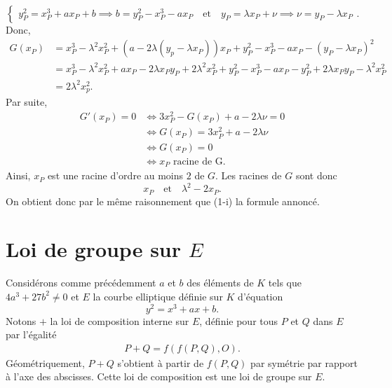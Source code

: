 \begin{demonstration}
\begin{description}
\begin{description}
\[\begin{cases}
                y_P^2=x_P^3+ax_P+b \implies b=y_P^2-x_P^3-ax_P \quad \text{et} \quad y_P=\lambda x_P + \nu \implies \nu = y_P - \lambda x_P
                    \end{cases}
                .\] 
                Donc,
                \begin{align*}
                    G(x_P) &=x_P^3-\lambda^2x_P^2+\left( a-2\lambda\left( y_p-\lambda x_P \right)  \right) x_P + y_P^2-x_P^3-ax_P-\left( y_P -\lambda x_P \right) ^2\\
                    &= x_P^3-\lambda^2 x_P^2+ax_P-2\lambda x_Py_P+2\lambda^2x_P^2+y_P^2-x_P^3-ax_P-y_P^2+2\lambda x_Py_P -\lambda^2x_P^2 \\
                    &= 2\lambda^2x_p^2 
                .\end{align*}
                Par suite,
                \begin{align*}
                    G'(x_P)=0 &\iff 3x_P^2-G(x_P)+a-2\lambda\nu =0 \\
                              & \iff G(x_P) = 3x_P^2+a-2\lambda\nu \\
                              & \iff G(x_P)=0 \\
                              & \iff x_P \text{ racine de G}
                .\end{align*}
Ainsi, $x_P$ est une racine d'ordre au moins $2$ de $G$. Les racines de $G$ sont donc 
\[
x_P \quad \text{et} \quad \lambda^2-2x_P
.\] 
On obtient donc par le même raisonnement que (1-i) la formule annoncé.
        \end{description}
    \end{description}
\end{demonstration}

\section{Loi de groupe sur $E$}

Considérons comme précédemment $a$ et $b$ des éléments de $K$ tels que $4a^3+27b^2\neq 0$ et $E$ la courbe elliptique définie sur $K$ d'équation
\[
y^2=x^3+ax+b
.\] 
Notons $+$ la loi de composition interne sur $E$, définie pour tous $P$ et $Q$ dans $E$ par l'égalité
\begin{align}
    \label{eq:groupe}
    P+Q=f(f(P,Q),O)
.\end{align}
Géométriquement, $P+Q$ s'obtient à partir de $f(P,Q)$ par symétrie par rapport à l'axe des abscisses. Cette loi de composition est une loi de groupe sur  $E$.

